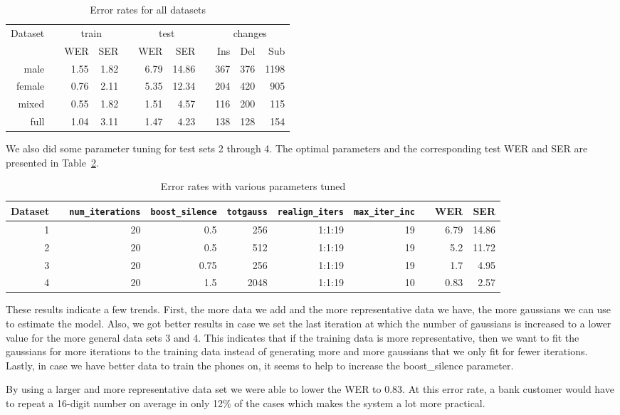 \documentclass[11pt]{article}
\begin{document}
\begin{table}\centering
  \begin{tabular}{@{}rcrrcrrcrrr@{}}\toprule%
    \multirow{2}{*}{Dataset} & \phantom{a} & \multicolumn{2}{c}{train}
    & \phantom{a} & \multicolumn{2}{c}{test} & \phantom{a}
    & \multicolumn{3}{c}{changes}\\
    \cmidrule{3-4} \cmidrule{6-7} \cmidrule{9-11}
    && WER & SER && WER & SER && Ins & Del & Sub\\ \midrule%
    male && 1.55 & 1.82 && 6.79 & 14.86 && 367 & 376 & 1198\\
    female && 0.76 & 2.11 && 5.35 & 12.34 && 204 & 420 & 905\\
    mixed && 0.55 & 1.82 && 1.51 & 4.57 && 116 & 200 & 115\\
    full && 1.04 & 3.11 && 1.47 & 4.23 && 138 & 128 & 154\\
    \bottomrule
  \end{tabular}
  \caption{Error rates for all datasets}\label{tab:wer-all}
\end{table}

We also did some parameter tuning for test sets 2 through 4. The optimal
parameters and the corresponding test WER and SER are presented in
Table~\ref{tab:wer-param}.

\begin{table}\centering
  \begin{tabular}{@{}rcrrrrrcrr@{}}\toprule%
    Dataset & \phantom{a} & \texttt{num\_iterations} & \texttt{boost\_silence}
    & \texttt{totgauss} & \texttt{realign\_iters} & \texttt{max\_iter\_inc}
    & \phantom{a} & WER & SER\\ \midrule%
    1 && 20 & 0.5 & 256 & 1:1:19 & 19 && 6.79 & 14.86\\
    2 && 20 & 0.5 & 512 & 1:1:19 & 19 && 5.2 & 11.72\\
    3 && 20 & 0.75 & 256 & 1:1:19 & 19 && 1.7 & 4.95\\
    4 && 20 & 1.5 & 2048 & 1:1:19 & 10 && 0.83 & 2.57\\
  \end{tabular}
  \caption{Error rates with various parameters tuned}\label{tab:wer-param}
\end{table}

These results indicate a few trends. First, the more data we add and the more
representative data we have, the more gaussians we can use to estimate the
model. Also, we got better results in case we set the last iteration at which
the number of gaussians is increased to a lower value for the more general data
sets 3 and 4. This indicates that if the training data is more representative,
then we want to fit the gaussians for more iterations to the training data
instead of generating more and more gaussians that we only fit for fewer
iterations. Lastly, in case we have better data to train the phones on, it seems
to help to increase the boost_silence parameter.

By using a larger and  more representative data set we were able to lower the
WER to 0.83. At this error rate, a bank customer would have to repeat a 16-digit
number on average in only 12\% of the cases which makes the system a lot more
practical.
\end{document}
